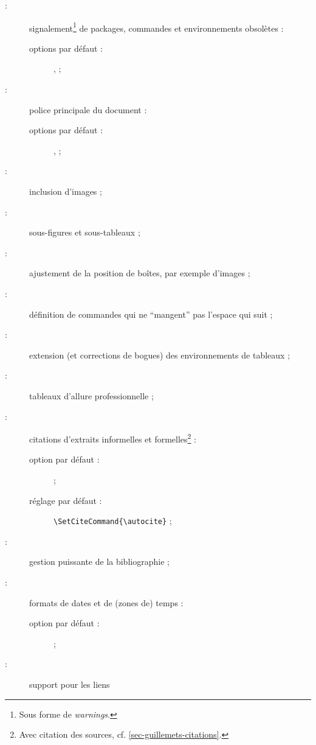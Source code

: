 \documentclass[french,nolocaltoc]{nwejmart}
\newtheorem[title=Fait,style=definition]{fact}
\begin{document}
\begin{description}
\item[ :] signalement\footnote{Sous forme de \emph{warnings}.} de
  packages, commandes et environnements obsolètes :
  \begin{description}
  \item[options par défaut :] ,  ;
  \end{description}
\item[ :] police principale du document :
  \begin{description}
  \item[options par défaut :] ,  ;
  \end{description}
\item[ :] inclusion d'images ;
\item[ :] sous-figures et sous-tableaux ;
\item[ :] ajustement de la position de boîtes, par exemple
  d'images ;
\item[ :] définition de commandes qui ne \enquote{mangent} pas
  l'espace qui suit ;
\item[ :] extension (et corrections de bogues) des
  environnements de tableaux ;
\item[ :] tableaux d'allure professionnelle ;
\item[ :] citations d'extraits informelles et
  formelles\footnote{Avec citation des sources,
    cf. \vref{sec-guillemets-citations}.} :
    \begin{description}
    \item[option par défaut :]  ;
    \item[réglage par défaut :]
      \lstinline[alsolanguage={[csquotes]TeX},alsolanguage={[biblatex]TeX}]|\SetCiteCommand{\autocite}| ;
  \end{description}
\item[ :] gestion puissante de la bibliographie ;
\item[ :] formats de dates et de (zones de) temps :
  \begin{description}
  \item[option par défaut :]  ;
  \end{description}
\item[ :] support pour les liens

\end{description}
\end{document}
